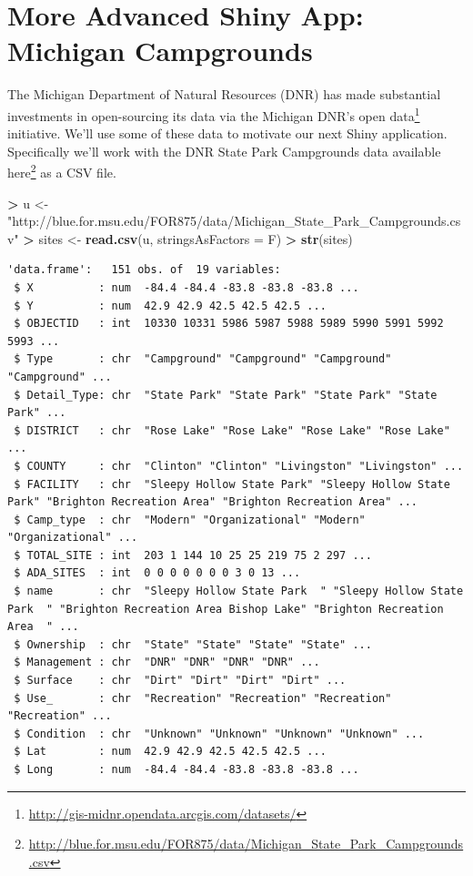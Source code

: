 \documentclass[]{krantz}
\makeatletter
\newenvironment{Shaded}{\begin{snugshade}}{\end{snugshade}}
\newcommand{\DataTypeTok}[1]{\textcolor[rgb]{0.27,0.27,0.27}{#1}}
\newcommand{\KeywordTok}[1]{\textcolor[rgb]{0.27,0.27,0.27}{\textbf{#1}}}
\newcommand{\NormalTok}[1]{#1}
\newcommand{\OperatorTok}[1]{\textcolor[rgb]{0.43,0.43,0.43}{\textbf{#1}}}
\newcommand{\StringTok}[1]{\textcolor[rgb]{0.5,0.5,0.5}{#1}}
\renewcommand{\href}[2]{#2\footnote{\url{#1}}}
\newenvironment{kframe}{%
\medskip{}
\setlength{\fboxsep}{.8em}
 \def\at@end@of@kframe{}%
 \ifinner\ifhmode%
  \def\at@end@of@kframe{\end{minipage}}%
  \begin{minipage}{\columnwidth}%
 \fi\fi%
 \def\FrameCommand##1{\hskip\@totalleftmargin \hskip-\fboxsep
 \colorbox{shadecolor}{##1}\hskip-\fboxsep
     \hskip-\linewidth \hskip-\@totalleftmargin \hskip\columnwidth}%
 \MakeFramed {\advance\hsize-\width
   \@totalleftmargin\z@ \linewidth\hsize
   \@setminipage}}%
 {\par\unskip\endMakeFramed%
 \at@end@of@kframe}
\renewenvironment{Shaded}{\begin{kframe}}{\end{kframe}}
\makeatother
\begin{document}
\hypertarget{more-advanced-shiny-app-michigan-campgrounds}{%
\section{More Advanced Shiny App: Michigan Campgrounds}\label{more-advanced-shiny-app-michigan-campgrounds}}

The Michigan Department of Natural Resources (DNR) has made substantial investments in open-sourcing its data via the \href{http://gis-midnr.opendata.arcgis.com/datasets/}{Michigan DNR's open data} initiative. We'll use some of these data to motivate our next Shiny application. Specifically we'll work with the DNR State Park Campgrounds data available \href{http://blue.for.msu.edu/FOR875/data/Michigan_State_Park_Campgrounds.csv}{here} as a CSV file.

\begin{Shaded}
\begin{Highlighting}[]
\OperatorTok{>}\StringTok{ }\NormalTok{u <-}\StringTok{ "http://blue.for.msu.edu/FOR875/data/Michigan_State_Park_Campgrounds.csv"}
\OperatorTok{>}\StringTok{ }\NormalTok{sites <-}\StringTok{ }\KeywordTok{read.csv}\NormalTok{(u, }\DataTypeTok{stringsAsFactors =}\NormalTok{ F)}
\OperatorTok{>}\StringTok{ }\KeywordTok{str}\NormalTok{(sites)}
\end{Highlighting}
\end{Shaded}

\begin{verbatim}
'data.frame':   151 obs. of  19 variables:
 $ X          : num  -84.4 -84.4 -83.8 -83.8 -83.8 ...
 $ Y          : num  42.9 42.9 42.5 42.5 42.5 ...
 $ OBJECTID   : int  10330 10331 5986 5987 5988 5989 5990 5991 5992 5993 ...
 $ Type       : chr  "Campground" "Campground" "Campground" "Campground" ...
 $ Detail_Type: chr  "State Park" "State Park" "State Park" "State Park" ...
 $ DISTRICT   : chr  "Rose Lake" "Rose Lake" "Rose Lake" "Rose Lake" ...
 $ COUNTY     : chr  "Clinton" "Clinton" "Livingston" "Livingston" ...
 $ FACILITY   : chr  "Sleepy Hollow State Park" "Sleepy Hollow State Park" "Brighton Recreation Area" "Brighton Recreation Area" ...
 $ Camp_type  : chr  "Modern" "Organizational" "Modern" "Organizational" ...
 $ TOTAL_SITE : int  203 1 144 10 25 25 219 75 2 297 ...
 $ ADA_SITES  : int  0 0 0 0 0 0 0 3 0 13 ...
 $ name       : chr  "Sleepy Hollow State Park  " "Sleepy Hollow State Park  " "Brighton Recreation Area Bishop Lake" "Brighton Recreation Area  " ...
 $ Ownership  : chr  "State" "State" "State" "State" ...
 $ Management : chr  "DNR" "DNR" "DNR" "DNR" ...
 $ Surface    : chr  "Dirt" "Dirt" "Dirt" "Dirt" ...
 $ Use_       : chr  "Recreation" "Recreation" "Recreation" "Recreation" ...
 $ Condition  : chr  "Unknown" "Unknown" "Unknown" "Unknown" ...
 $ Lat        : num  42.9 42.9 42.5 42.5 42.5 ...
 $ Long       : num  -84.4 -84.4 -83.8 -83.8 -83.8 ...
\end{verbatim}
\end{document}
